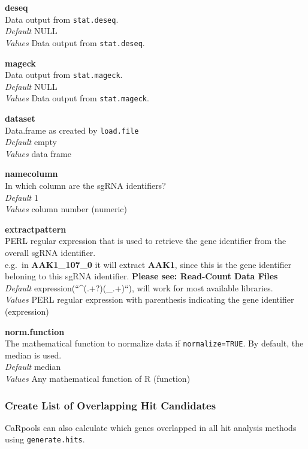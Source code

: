\documentclass[]{article}
\begin{document}
\textbf{deseq}\\
Data output from \texttt{stat.deseq}.\\
\emph{Default} NULL\\
\emph{Values} Data output from \texttt{stat.deseq}.

\textbf{mageck}\\
Data output from \texttt{stat.mageck}.\\
\emph{Default} NULL\\
\emph{Values} Data output from \texttt{stat.mageck}.

\textbf{dataset}\\
Data.frame as created by \texttt{load.file}\\
\emph{Default} empty\\
\emph{Values} data frame

\textbf{namecolumn}\\
In which column are the sgRNA identifiers?\\
\emph{Default} 1\\
\emph{Values} column number (numeric)

\textbf{extractpattern}\\
PERL regular expression that is used to retrieve the gene identifier
from the overall sgRNA identifier.\\
e.g.~in \textbf{AAK1\_107\_0} it will extract \textbf{AAK1}, since this
is the gene identifier beloning to this sgRNA identifier. \textbf{Please
see: Read-Count Data Files}\\
\emph{Default} expression(``\^{}(.+?)(\_.+)``), will work for most
available libraries.\\
\emph{Values} PERL regular expression with parenthesis indicating the
gene identifier (expression)

\textbf{norm.function}\\
The mathematical function to normalize data if \texttt{normalize=TRUE}.
By default, the median is used.\\
\emph{Default} median\\
\emph{Values} Any mathematical function of R (function)

\subsubsection{Create List of Overlapping Hit
Candidates}\label{create-list-of-overlapping-hit-candidates}

CaRpools can also calculate which genes overlapped in all hit analysis
methods using \texttt{generate.hits}.
\end{document}
